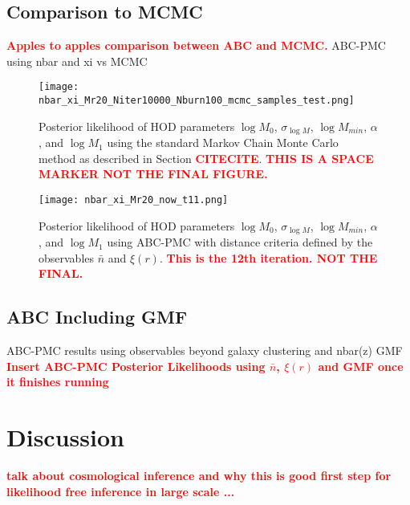 \documentclass[12pt, preprint]{aastex}
\newcommand{\todo}[1]{{\bf \textcolor{red}{ #1}}}
\begin{document}
\subsection{Comparison to MCMC}
\todo{Apples to apples comparison between ABC and MCMC.}
ABC-PMC using nbar and xi vs MCMC
\begin{figure*}
\begin{center}
\texttt{[image: nbar\_xi\_Mr20\_Niter10000\_Nburn100\_mcmc\_samples\_test.png]}
\caption{Posterior likelihood of HOD parameters $\log M_0$, 
$\sigma_{\log M}$, $\log M_{min}$, $\alpha$, and $\log M_1$ using the
standard Markov Chain Monte Carlo method as described in Section \todo{CITECITE}. 
\todo{THIS IS A SPACE MARKER NOT THE FINAL FIGURE.}}
\label{fig:post_abc_nbarxi}
\end{center}
\end{figure*}
\begin{figure*}
\begin{center}
\texttt{[image: nbar\_xi\_Mr20\_now\_t11.png]}
\caption{Posterior likelihood of HOD parameters $\log M_0$, 
$\sigma_{\log M}$, $\log M_{min}$, $\alpha$, and $\log M_1$ using ABC-PMC 
with distance criteria defined by the observables $\bar{n}$ and $\xi(r)$.
\todo{This is the 12th iteration. NOT THE FINAL.}}
\label{fig:post_abc_nbarxi}
\end{center}
\end{figure*}

\subsection{ABC Including GMF}
ABC-PMC results using observables beyond galaxy clustering and nbar(z) GMF
\todo{Insert ABC-PMC Posterior Likelihoods using $\bar{n}$, $\xi(r)$ and GMF 
once it finishes running}


\section{Discussion}\label{sec:discussion}
\todo{talk about cosmological inference and why this is good first step for likelihood free inference in large scale ...}
\end{document}
